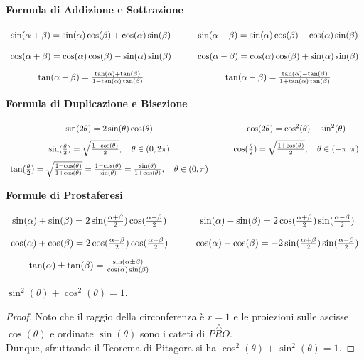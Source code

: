 \textbf{Formula di Addizione e Sottrazione}
\[\arraycolsep=5pt\def\arraystretch{2}
	\begin{array}{ccc}
		\sin(\alpha + \beta) = \sin(\alpha) \cos(\beta) + \cos(\alpha) \sin(\beta) & \quad &
		\sin(\alpha - \beta) = \sin(\alpha) \cos(\beta) - \cos(\alpha) \sin(\beta)\\
		\cos(\alpha + \beta) = \cos(\alpha) \cos(\beta) - \sin(\alpha) \sin(\beta) & \quad &
		\cos(\alpha - \beta) = \cos(\alpha) \cos(\beta) + \sin(\alpha) \sin(\beta)\\
		\tan(\alpha + \beta) = \frac{\tan(\alpha) + \tan(\beta)}{1 - \tan(\alpha)\tan(\beta)} & \quad &
		\tan(\alpha - \beta) = \frac{\tan(\alpha) - \tan(\beta)}{1 + \tan(\alpha)\tan(\beta)}\\
	\end{array}
\]

\textbf{Formula di Duplicazione e Bisezione}
\[\arraycolsep=5pt\def\arraystretch{2}
	\begin{array}{ccc}
		\sin(2\theta) = 2 \sin(\theta) \cos(\theta) & \quad & \cos(2\theta) = \cos^2(\theta) - \sin^2(\theta)\\
		\sin(\frac{\theta}{2}) = \sqrt{\frac{1 - \cos(\theta)}{2}}, \quad \theta \in (0, 2\pi) & \quad &
		\cos(\frac{\theta}{2}) = \sqrt{\frac{1 + \cos(\theta)}{2}}, \quad \theta \in (-\pi, \pi)\\
		\tan(\frac{\theta}{2}) = \sqrt{\frac{1 - \cos(\theta)}{1 + \cos(\theta)}}
		= \frac{1 - \cos(\theta)}{\sin(\theta)} = \frac{\sin(\theta)}{1 + \cos(\theta)}, \quad \theta \in (0, \pi)
	\end{array}
\]

\textbf{Formule di Prostaferesi}
\[\arraycolsep=5pt\def\arraystretch{2}
	\begin{array}{ccc}
		\sin(\alpha) + \sin(\beta) = 2 \sin(\frac{\alpha + \beta}{2}) \cos(\frac{\alpha - \beta}{2}) & \quad &
		\sin(\alpha) - \sin(\beta) = 2 \cos(\frac{\alpha + \beta}{2}) \sin(\frac{\alpha - \beta}{2})\\
		\cos(\alpha) + \cos(\beta) = 2 \cos(\frac{\alpha + \beta}{2}) \cos(\frac{\alpha - \beta}{2}) & \quad &
		\cos(\alpha) - \cos(\beta) = -2 \sin(\frac{\alpha + \beta}{2}) \sin(\frac{\alpha - \beta}{2})\\
		\tan(\alpha) \pm \tan(\beta) = \frac{\sin(\alpha \pm \beta)}{\cos(\alpha) \sin(\beta)}
	\end{array}
\]

\begin{proposition}
	$\sin^2(\theta) + \cos^2(\theta) = 1$.
	\begin{proof}
		Noto che il raggio della circonferenza è $r = 1$ e le proiezioni sulle
		ascisse $\cos(\theta)$ e ordinate $\sin(\theta)$ sono i cateti di $\overset{\triangle}{PRO}$.\\
		Dunque, sfruttando il Teorema di Pitagora si ha $ \cos^2(\theta) + \sin^2(\theta) = 1 $.
	\end{proof}
\end{proposition}

